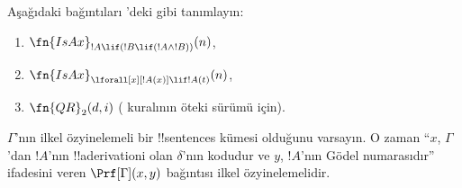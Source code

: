 \documentclass[../../../include/open-logic-section]{subfiles}
\begin{document}
\begin{prob}
Aşağıdaki bağıntıları 'deki gibi
tanımlayın:
\begin{enumerate}
\item $\fn{IsAx}_{!A \lif (!B \lif (!A \land !B))}(n)$,
\item $\fn{IsAx}_{\lforall[x][!A(x)] \lif !A(t)}(n)$,
\item $\fn{QR}_{2}(d, i)$ (\QR{} kuralının öteki sürümü için).
\end{enumerate}
\end{prob}

\begin{prop}
$\Gamma$'nın ilkel özyinelemeli bir !!{sentence}s kümesi olduğunu varsayın.
O zaman ``$x$, $\Gamma$'dan $!A$'nın !!a{derivation}{}i olan $\delta$'nın kodudur
ve $y$, $!A$'nın Gödel numarasıdır'' ifadesini veren
$\Prf[\Gamma](x, y)$ bağıntısı ilkel özyinelemelidir.
\end{prop}
\end{document}
